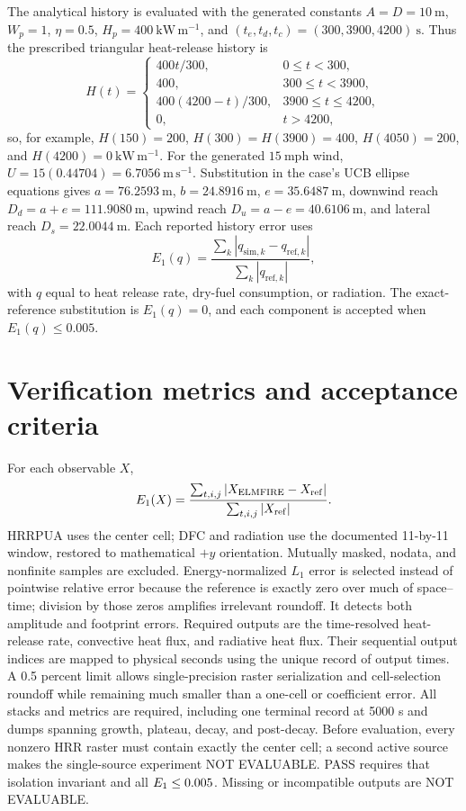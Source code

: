 The analytical history is evaluated with the generated constants
\(A=D=10~\mathrm{m}\), \(W_p=1\), \(\eta=0.5\),
\(H_p=400~\mathrm{kW\,m^{-1}}\), and
\((t_e,t_d,t_c)=(300,3900,4200)~\mathrm{s}\).  Thus the prescribed
triangular heat-release history is
\[
 H(t)=\begin{cases}
 400t/300,&0\leq t<300,\\
 400,&300\leq t<3900,\\
 400(4200-t)/300,&3900\leq t\leq4200,\\
 0,&t>4200,
 \end{cases}
\]
so, for example, \(H(150)=200\), \(H(300)=H(3900)=400\),
\(H(4050)=200\), and \(H(4200)=0~\mathrm{kW\,m^{-1}}\).
For the generated \(15~\mathrm{mph}\) wind,
\(U=15(0.44704)=6.7056~\mathrm{m\,s^{-1}}\).  Substitution in the
case's UCB ellipse equations gives
\(a=76.2593~\mathrm{m}\), \(b=24.8916~\mathrm{m}\),
\(e=35.6487~\mathrm{m}\), downwind reach
\(D_d=a+e=111.9080~\mathrm{m}\), upwind reach
\(D_u=a-e=40.6106~\mathrm{m}\), and lateral reach
\(D_s=22.0044~\mathrm{m}\).  Each reported history error uses
\[
 E_1(q)=\frac{\sum_k|q_{\mathrm{sim},k}-q_{\mathrm{ref},k}|}
              {\sum_k|q_{\mathrm{ref},k}|},
\]
with \(q\) equal to heat release rate, dry-fuel consumption, or radiation.
The exact-reference substitution is \(E_1(q)=0\), and each component is
accepted when \(E_1(q)\leq0.005\).

\section{Verification metrics and acceptance criteria}

For each observable \(X\),
\[
 E_1(X)=\frac{\sum_{t,i,j}|X_{\rm ELMFIRE}-X_{\rm ref}|}
                   {\sum_{t,i,j}|X_{\rm ref}|}.
\]
HRRPUA uses the center cell; DFC and radiation use the documented 11-by-11 window, restored to mathematical \(+y\) orientation. Mutually masked, nodata, and nonfinite samples are excluded. Energy-normalized \(L_1\) error is selected instead of pointwise relative error because the reference is exactly zero over much of space--time; division by those zeros amplifies irrelevant roundoff. It detects both amplitude and footprint errors. Required outputs are the time-resolved heat-release rate, convective heat flux, and radiative heat flux. Their sequential output indices are mapped to physical seconds using the unique record of output times. A 0.5 percent limit allows single-precision raster serialization and cell-selection roundoff while remaining much smaller than a one-cell or coefficient error. All stacks and metrics are required, including one terminal record at 5000 s and dumps spanning growth, plateau, decay, and post-decay. Before evaluation, every nonzero HRR raster must contain exactly the center cell; a second active source makes the single-source experiment NOT EVALUABLE. PASS requires that isolation invariant and all \(E_1\le0.005\). Missing or incompatible outputs are NOT EVALUABLE.

